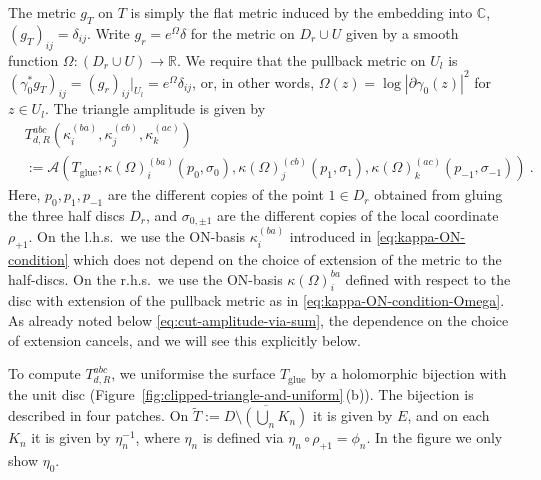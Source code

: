 \documentclass[11pt,a4paper]{article}
\numberwithin{equation}{section}
\begin{document}
The metric $g_T$ on $T$ is simply the flat metric induced by the embedding into $\mathbb{C}$, $(g_T)_{ij} = \delta_{ij}$. 
Write $g_r = e^{\Omega} \delta$ for the metric on $D_r \cup U$ given by a smooth function $\Omega : (D_r \cup U) \to \mathbb{R}$. We require that the pullback metric on $U_l$ is $(\gamma_0^* g_T)_{ij} = (g_r)_{ij}|_{U_l} = e^{\Omega} \delta_{ij}$, or, in other words, $\Omega(z) = \log |\partial\gamma_0(z)|^2$ for $z \in U_l$. 
The triangle amplitude is given by
\begin{align}
    &T_{d,R}^{abc}(\kappa^{(ba)}_i,\kappa^{(cb)}_j,\kappa^{(ac)}_k)
    \nonumber\\
    &:=
    \mathcal{A}(T_{\text{glue}};\kappa(\Omega)_i^{(ba)}(p_0,\sigma_0),\kappa(\Omega)_j^{(cb)}(p_1,\sigma_1),\kappa(\Omega)_k^{(ac)}(p_{-1},\sigma_{-1})) \ .
\end{align}
Here, $p_0, p_1, p_{-1}$ are the different copies of the point $1 \in D_r$ obtained from gluing the three half discs $D_r$, and $\sigma_{0,\pm 1}$ are the different copies of the local coordinate $\rho_{+1}$. On the l.h.s.\ we use the ON-basis $\kappa^{(ba)}_i$ introduced in \eqref{eq:kappa-ON-condition} which does not depend on the choice of extension of the metric to the half-discs. On the r.h.s.\ we use  the ON-basis $\kappa(\Omega)_i^{ba}$ defined with respect to the disc with extension of the pullback metric as in \eqref{eq:kappa-ON-condition-Omega}. As already noted below \eqref{eq:cut-amplitude-via-sum}, the dependence on the choice of extension cancels, and we will see this explicitly below.

\medskip

To compute $T_{d,R}^{abc}$, we uniformise the surface $T_{\text{glue}}$ by a holomorphic bijection with the unit disc (Figure~\ref{fig:clipped-triangle-and-uniform}\,(b)). The bijection is described in four patches. On $\widetilde T := \overline{D \setminus (\bigcup_n K_n)}$ it is given by $E$, and on each $K_n$ it is given by $\eta_n^{-1}$, where $\eta_n$ is defined via $\eta_n \circ \rho_{+1} = \phi_n$. In the figure we only show $\eta_0$. 
\end{document}
